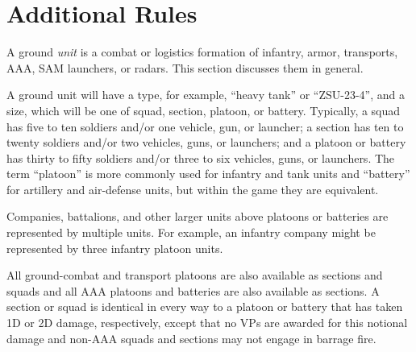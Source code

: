 


\chapter{Additional Rules}


A ground \emph{unit} is a combat or logistics formation of infantry, armor, transports, AAA, SAM launchers, or radars. This section discusses them in general.%


A ground unit will have a type, for example, “heavy tank” or “ZSU-23-4”, and a size, which will be one of squad, section, platoon, or battery. Typically, a squad has five to ten soldiers and/or one vehicle, gun, or launcher; a section has ten to twenty soldiers and/or two vehicles, guns, or launchers; and a platoon or battery has thirty to fifty soldiers and/or three to six vehicles, guns, or launchers.
The term “platoon” is more commonly used for infantry and tank units and “battery” for artillery and air-defense units, but within the game they are equivalent.

Companies, battalions, and other larger units above platoons or batteries are represented by multiple units. For example, an infantry company might be represented by three infantry platoon units.

All ground-combat and transport platoons are also available as sections and squads and all AAA platoons and batteries are also available as sections.
A section or squad is identical in every way to a platoon or battery that has taken 1D or 2D damage, respectively, except that no VPs are awarded for this notional damage and non-AAA squads and sections may not engage in barrage fire.%

